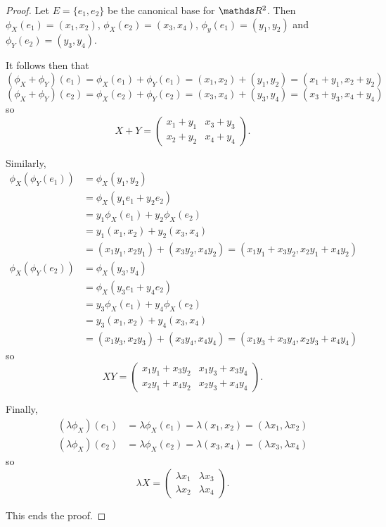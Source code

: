 \begin{proof}
	Let $E=\{e_1,e_2\}$ be the canonical base for $\R^2$. Then $\phi_X(e_1)=(x_1,x_2)$, $\phi_X(e_2)=(x_3,x_4)$, $\phi_y(e_1)=(y_1,y_2)$ and $\phi_Y(e_2)=(y_3,y_4)$.
	
	It follows then that 
	\[(\phi_X+\phi_Y)(e_1)=\phi_X(e_1)+\phi_Y(e_1)=(x_1,x_2)+(y_1,y_2)=(x_1+y_1,x_2+y_2)\]
	\[(\phi_X+\phi_Y)(e_2)=\phi_X(e_2)+\phi_Y(e_2)=(x_3,x_4)+(y_3,y_4)=(x_3+y_3,x_4+y_4)\]
	so \[X+Y=\begin{pmatrix}
	x_1+y_1&x_3+y_3\\
	x_2+y_2&x_4+y_4
	\end{pmatrix}.\]
	
	Similarly, 
	\begin{align*}
		\phi_X(\phi_Y(e_1))&=\phi_X(y_1,y_2)\\
		&=\phi_X(y_1e_1+y_2e_2)\\
		&=y_1\phi_X(e_1)+y_2 \phi_X(e_2)\\
		&=y_1(x_1,x_2)+y_2(x_3,x_4)\\
		&=(x_1y_1,x_2y_1)+(x_3y_2,x_4y_2)=(x_1y_1+x_3y_2,x_2y_1+x_4y_2)		
	\end{align*}
	\begin{align*}
	\phi_X(\phi_Y(e_2))&=\phi_X(y_3,y_4)\\
	&=\phi_X(y_3e_1+y_4e_2)\\
	&=y_3\phi_X(e_1)+y_4 \phi_X(e_2)\\
	&=y_3(x_1,x_2)+y_4(x_3,x_4)\\
	&=(x_1y_3,x_2y_3)+(x_3y_4,x_4y_4)=(x_1y_3+x_3y_4,x_2y_3+x_4y_4)		
	\end{align*}so\[XY=\begin{pmatrix}
	x_1y_1+x_3y_2&x_1y_3+x_3y_4\\
	x_2y_1+x_4y_2&x_2y_3+x_4y_4
	\end{pmatrix}.\]
	
	Finally,
	\begin{align*}
		(\lambda \phi_X)(e_1)&=\lambda \phi_X(e_1)=\lambda (x_1,x_2)=(\lambda x_1,\lambda x_2)
	\end{align*}
	\begin{align*}
	(\lambda \phi_X)(e_2)&=\lambda \phi_X(e_2)=\lambda (x_3,x_4)=(\lambda x_3,\lambda x_4)
	\end{align*}so \[\lambda X=\begin{pmatrix}
	\lambda x_1&\lambda x_3\\
	\lambda x_2&\lambda x_4
	\end{pmatrix}.\]
	
	This ends the proof.
\end{proof}

